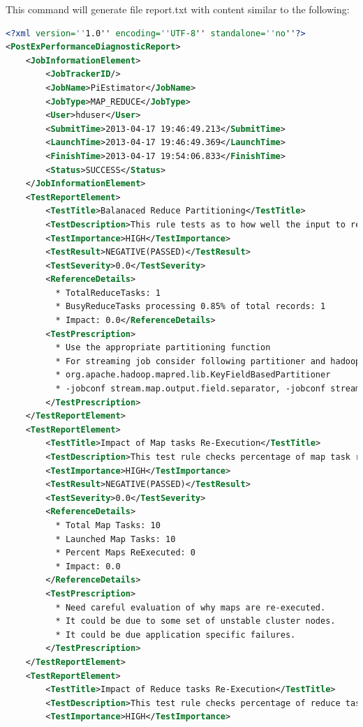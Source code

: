 This command will generate file report.txt with content similar to the following:
\lstset{style=bashstyle}
\begin{lstlisting}[language=XML]
<?xml version=''1.0'' encoding=''UTF-8'' standalone=''no''?>
<PostExPerformanceDiagnosticReport>
    <JobInformationElement>
        <JobTrackerID/>
        <JobName>PiEstimator</JobName>
        <JobType>MAP_REDUCE</JobType>
        <User>hduser</User>
        <SubmitTime>2013-04-17 19:46:49.213</SubmitTime>
        <LaunchTime>2013-04-17 19:46:49.369</LaunchTime>
        <FinishTime>2013-04-17 19:54:06.833</FinishTime>
        <Status>SUCCESS</Status>
    </JobInformationElement>
    <TestReportElement>
        <TestTitle>Balanaced Reduce Partitioning</TestTitle>
        <TestDescription>This rule tests as to how well the input to reduce tasks is balanced</TestDescription>
        <TestImportance>HIGH</TestImportance>
        <TestResult>NEGATIVE(PASSED)</TestResult>
        <TestSeverity>0.0</TestSeverity>
        <ReferenceDetails>
          * TotalReduceTasks: 1
          * BusyReduceTasks processing 0.85% of total records: 1
          * Impact: 0.0</ReferenceDetails>
        <TestPrescription>
          * Use the appropriate partitioning function
          * For streaming job consider following partitioner and hadoop config parameters
          * org.apache.hadoop.mapred.lib.KeyFieldBasedPartitioner  
          * -jobconf stream.map.output.field.separator, -jobconf stream.num.map.output.key.fields
        </TestPrescription>
    </TestReportElement>
    <TestReportElement>
        <TestTitle>Impact of Map tasks Re-Execution</TestTitle>
        <TestDescription>This test rule checks percentage of map task re-execution impacting the job performance</TestDescription>
        <TestImportance>HIGH</TestImportance>
        <TestResult>NEGATIVE(PASSED)</TestResult>
        <TestSeverity>0.0</TestSeverity>
        <ReferenceDetails>
          * Total Map Tasks: 10
          * Launched Map Tasks: 10
          * Percent Maps ReExecuted: 0
          * Impact: 0.0
        </ReferenceDetails>
        <TestPrescription>
          * Need careful evaluation of why maps are re-executed.  
          * It could be due to some set of unstable cluster nodes.
          * It could be due application specific failures.
        </TestPrescription>
    </TestReportElement>
    <TestReportElement>
        <TestTitle>Impact of Reduce tasks Re-Execution</TestTitle>
        <TestDescription>This test rule checks percentage of reduce task re-execution impacting the job performance</TestDescription>
        <TestImportance>HIGH</TestImportance>

\end{lstlisting}
